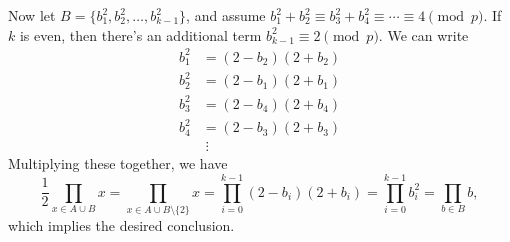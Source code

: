 Now let $B=\{b_1^2,b_2^2,\ldots,b_{k-1}^2\}$, and assume $b_1^2+b_2^2\equiv b_3^2+b_4^2\equiv\cdots\equiv4\pmod p$. If $k$ is even, then there's an additional term $b_{k-1}^2\equiv2\pmod p$. We can write
\begin{align*}
    b_1^2&=(2-b_2)(2+b_2)\\
    b_2^2&=(2-b_1)(2+b_1)\\
    b_3^2&=(2-b_4)(2+b_4)\\
    b_4^2&=(2-b_3)(2+b_3)\\
    &\;\vdots
\end{align*}
Multiplying these together, we have
\[\frac12\prod_{x\in A\cup B}x=\prod_{x\in A\cup B\setminus\{2\}}x=\prod_{i=0}^{k-1}(2-b_i)(2+b_i)=\prod_{i=0}^{k-1}b_i^2=\prod_{b\in B}b,\]
which implies the desired conclusion.

